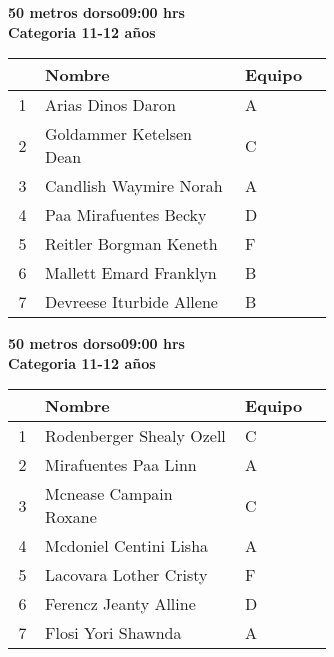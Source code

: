 \begin{minipage}{0.95\linewidth}\vspace{0.5cm} 
\begin{flushleft}
\textbf{
\hspace{-0.15cm}50 metros dorso\hspace{1.5cm}09:00 hrs \\Categoria 11-12 años}\vspace{-0.2cm} 
\end{flushleft}
\begin{tabular}{cp{0.63\linewidth}l}
\hline
& \textbf{Nombre} & \textbf{Equipo} \\ \hline
1 & Arias Dinos Daron & A \\ 
2 & Goldammer Ketelsen Dean & C \\ 
3 & Candlish Waymire Norah & A \\ 
4 & Paa Mirafuentes Becky & D \\ 
5 & Reitler Borgman Keneth & F \\ 
6 & Mallett Emard Franklyn & B \\ 
7 & Devreese Iturbide Allene & B \\ 
\end{tabular}
\end{minipage}
\begin{minipage}{0.95\linewidth}\vspace{0.5cm} 
\begin{flushleft}
\textbf{
\hspace{-0.15cm}50 metros dorso\hspace{1.5cm}09:00 hrs \\Categoria 11-12 años}\vspace{-0.2cm} 
\end{flushleft}
\begin{tabular}{cp{0.63\linewidth}l}
\hline
& \textbf{Nombre} & \textbf{Equipo} \\ \hline
1 & Rodenberger Shealy Ozell & C \\ 
2 & Mirafuentes Paa Linn & A \\ 
3 & Mcnease Campain Roxane & C \\ 
4 & Mcdoniel Centini Lisha & A \\ 
5 & Lacovara Lother Cristy & F \\ 
6 & Ferencz Jeanty Alline & D \\ 
7 & Flosi Yori Shawnda & A \\ 
\end{tabular}
\end{minipage}
